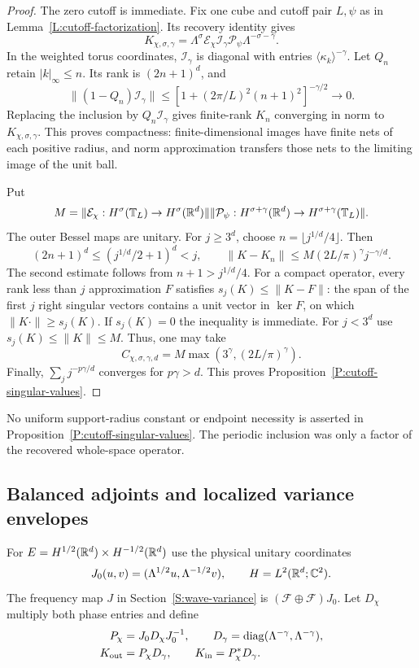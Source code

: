 \begin{proof}
  The zero cutoff is immediate. Fix one cube and cutoff pair $L,\psi$ as
  in Lemma~\ref{L:cutoff-factorization}. Its recovery identity gives
  \[
    K_{\chi,\sigma,\gamma}
    =\Lambda^\sigma\mathcal E_\chi\mathcal I_\gamma
    \mathcal P_\psi\Lambda^{-\sigma-\gamma}.
  \]
  In the weighted torus coordinates, $\mathcal I_\gamma$ is diagonal with
  entries $\langle\kappa_k\rangle^{-\gamma}$. Let $Q_n$ retain
  $|k|_\infty\le n$. Its rank is $(2n+1)^d$, and
  \[
    \|(1-Q_n)\mathcal I_\gamma\|
    \le [1+(2\pi/L)^2(n+1)^2]^{-\gamma/2}\longrightarrow0.
  \]
  Replacing the inclusion by $Q_n\mathcal I_\gamma$ gives finite-rank
  $K_n$ converging in norm to $K_{\chi,\sigma,\gamma}$. This proves
  compactness: finite-dimensional images have finite nets of each positive
  radius, and norm approximation transfers those nets to the limiting image
  of the unit ball.

  Put
  \[
    M=\|\mathcal E_\chi:H^\sigma(\mathbb T_L)\to H^\sigma(\mathbb{R}^d)\|
    \|\mathcal P_\psi:H^{\sigma+\gamma}(\mathbb{R}^d)
    \to H^{\sigma+\gamma}(\mathbb T_L)\|.
  \]
  The outer Bessel maps are unitary. For $j \ge 3^d$, choose
  $n=\lfloor j^{1/d}/4\rfloor$. Then
  \[
    (2n+1)^d\le(j^{1/d}/2+1)^d<j,\qquad
    \|K-K_n\|\le M(2L/\pi)^\gamma j^{-\gamma/d}.
  \]
  The second estimate follows from $n+1>j^{1/d}/4$. For a compact
  operator, every rank less than $j$ approximation $F$ satisfies
  $s_j(K)\le\|K-F\|$: the span of the first $j$ right singular vectors
  contains a unit vector in $\ker F$, on which $\|K\cdot\|\ge s_j(K)$.
  If $s_j(K)=0$ the inequality is immediate. For $j<3^d$ use
  $s_j(K)\le\|K\|\le M$. Thus, one may take
  \[
    C_{\chi,\sigma,\gamma,d}
    =M\max(3^\gamma,(2L/\pi)^\gamma).
  \]
  Finally, $\sum_j j^{-p\gamma/d}$ converges for $p\gamma>d$.
  This proves Proposition~\ref{P:cutoff-singular-values}.
\end{proof}

No uniform support-radius constant or endpoint necessity is asserted in
Proposition~\ref{P:cutoff-singular-values}. The periodic inclusion was only
a factor of the recovered whole-space operator.

\subsection{Balanced adjoints and localized variance envelopes}

For $E=H^{1/2}(\mathbb{R}^d)\times H^{-1/2}(\mathbb{R}^d)$ use the physical unitary
coordinates
\[
  J_0(u,v)=(\Lambda^{1/2}u,\Lambda^{-1/2}v),\qquad
  H=L^2(\mathbb{R}^d;\mathbb C^2).
\]
The frequency map $J$ in Section~\ref{S:wave-variance} is
$(\mathcal F\oplus\mathcal F)J_0$. Let $D_\chi$ multiply both phase
entries and define
\begin{align}
  P_\chi&=J_0D_\chi J_0^{-1},\qquad
  D_\gamma=\operatorname{diag}(\Lambda^{-\gamma},\Lambda^{-\gamma}),
  \label{E:compact-balanced-cutoff}\\
  K_{\rm out}&=P_\chi D_\gamma,\qquad
  K_{\rm in}=P_\chi^*D_\gamma.
  \label{E:compact-two-factors}
\end{align}

